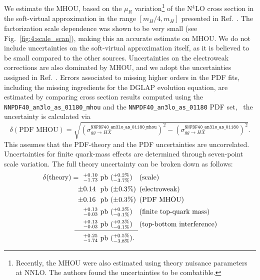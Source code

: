 We estimate the \acs{MHOU}, based on the $\mu_R$ variation\footnote{Recently, the \acs{MHOU} were also estimated using theory nuisance parameters~\cite{Lim:2024nsk} at \acs{NNLO}. The authors found the uncertainties to be combatible.} of the N${}^4$LO cross section in the soft-virtual approximation in the range $[m_H/4, m_H]$ presented in Ref.~\cite{Das:2020adl}. The factorization scale dependence was shown to be very small (see Fig.~\ref{fig:4:scale_scan}), making this an accurate estimate on \acs{MHOU}. We do not include uncertainties on the soft-virtual approximation itself, as it is believed to be small compared to the other sources. Uncertainties on the electroweak corrections are also dominated by \acs{MHOU}, and we adopt the uncertainties assigned in Ref.~\cite{Becchetti:2020wof}. Errors associated to missing higher orders in the \acs{PDF} fits, including the missing ingredients for the DGLAP evolution equation, are estimated by comparing cross section results computed using the \texttt{NNPDF40\_an3lo\_as\_01180\_mhou} and the \texttt{NNPDF40\_an3lo\_as\_01180} \acs{PDF} set, \ie\ the uncertainty is calculated via
\begin{equation}
\delta (\text{PDF MHOU}) = \sqrt{\left(\sigma_{gg \rightarrow HX}^\mathtt{NNPDF40\_an3lo\_as\_01180\_mhou} \right)^2 - \left(\sigma_{gg \rightarrow HX}^\mathtt{NNPDF40\_an3lo\_as\_01180} \right)^2}.
\end{equation}
This assumes that the \acs{PDF}-theory and the \acs{PDF} uncertainties are uncorrelated. Uncertainties for finite quark-mass effects are determined through seven-point scale variation. The full theory uncertainty can be broken down as follows:
\begin{equation}
\begin{alignedat}{5}
\delta(\text{theory}) =\ \  & {}^{+0.10}_{-1.73}\ &&\text{pb    }  && ({}_{-3.7\%}^{+0.2\%}) \quad  &&(\text{scale}) \\
\pm & 0.14\ &&\mathrm{pb}  && (\pm 0.3\%) &&(\text{electroweak}) \\
\pm & 0.16\ &&\mathrm{pb} && (\pm 0.3\%) &&(\text{PDF MHOU}) \\
& {}^{+0.13}_{-0.03}\ &&\mathrm{pb}  && ({}_{-0.1\%}^{+0.3\%}) &&(\text{finite top-quark mass}) \\
& {}^{+0.13}_{-0.03}\ &&\mathrm{pb}  && ({}_{-0.1\%}^{+0.3\%}) &&(\text{top-bottom interference}) \\[-10pt]
& && \hspace{0.3cm} \mathclap{\rule{3.2cm}{0.4pt}}\\[-4pt]
& {}^{+0.25}_{-1.74}  \ &&\mathrm{pb} && ({}_{-3.8\%}^{+0.5\%}).
\end{alignedat}
\end{equation}
